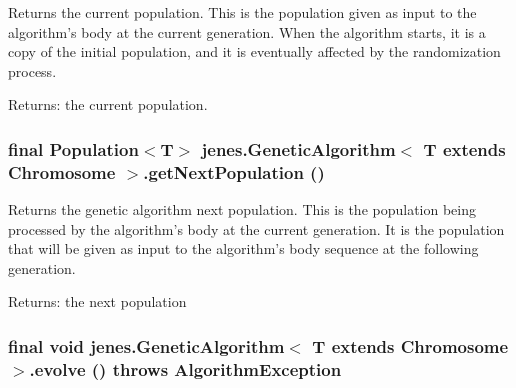 Returns the current population. This is the population given as input to the algorithm's body at the current generation. When the algorithm starts, it is a copy of the initial population, and it is eventually affected by the randomization process. 

\begin{Desc}
\item[Returns:]the current population. \end{Desc}
\hypertarget{classjenes_1_1_genetic_algorithm_3_01_t_01extends_01_chromosome_01_4_5d22b21350638a64a66d3599b2777982}{
\subsubsection[getNextPopulation]{\setlength{\rightskip}{0pt plus 5cm}final Population$<$T$>$ jenes.GeneticAlgorithm$<$ T extends Chromosome $>$.getNextPopulation ()}}
\label{classjenes_1_1_genetic_algorithm_3_01_t_01extends_01_chromosome_01_4_5d22b21350638a64a66d3599b2777982}


Returns the genetic algorithm next population. This is the population being processed by the algorithm's body at the current generation. It is the population that will be given as input to the algorithm's body sequence at the following generation. 

\begin{Desc}
\item[Returns:]the next population \end{Desc}
\hypertarget{classjenes_1_1_genetic_algorithm_3_01_t_01extends_01_chromosome_01_4_8afdd855dc891b981cbf675c63db72c3}{
\subsubsection[evolve]{\setlength{\rightskip}{0pt plus 5cm}final void jenes.GeneticAlgorithm$<$ T extends Chromosome $>$.evolve ()  throws {\bf AlgorithmException} }}
\label{classjenes_1_1_genetic_algorithm_3_01_t_01extends_01_chromosome_01_4_8afdd855dc891b981cbf675c63db72c3}


